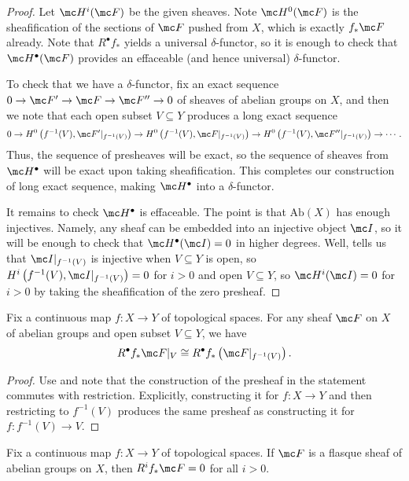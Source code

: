 \documentclass[../notes.tex]{subfiles}
\begin{document}
\begin{proof}
	Let $\mc H^i(\mc F)$ be the given sheaves. Note $\mc H^0(\mc F)$ is the sheafification of the sections of $\mc F$ pushed from $X$, which is exactly $f_*\mc F$ already. Note that $R^\bullet f_*$ yields a universal $\delta$-functor, so it is enough to check that $\mc H^\bullet(\mc F)$ provides an effaceable (and hence universal) $\delta$-functor.

	To check that we have a $\delta$-functor, fix an exact sequence $0\to\mc F'\to\mc F\to\mc F''\to0$ of sheaves of abelian groups on $X$, and then we note that each open subset $V\subseteq Y$ produces a long exact sequence
	\[0\to H^0\left(f^{-1}(V),\mc F'|_{f^{-1}(V)}\right)\to H^0\left(f^{-1}(V),\mc F|_{f^{-1}(V)}\right)\to H^0\left(f^{-1}(V),\mc F''|_{f^{-1}(V)}\right)\to\cdots.\]
	Thus, the sequence of presheaves will be exact, so the sequence of sheaves from $\mc H^\bullet$ will be exact upon taking sheafification. This completes our construction of long exact sequence, making $\mc H^\bullet$ into a $\delta$-functor.

	It remains to check $\mc H^\bullet$ is effaceable. The point is that $\mathrm{Ab}(X)$ has enough injectives. Namely, any sheaf can be embedded into an injective object $\mc I$, so it will be enough to check that $\mc H^\bullet(\mc I)=0$ in higher degrees. Well,  tells us that $\mc I|_{f^{-1}(V)}$ is injective when $V\subseteq Y$ is open, so $H^i\left(f^{-1}(V),\mc I|_{f^{-1}(V)}\right)=0$ for $i>0$ and open $V\subseteq Y$, so $\mc H^i(\mc I)=0$ for $i>0$ by taking the sheafification of the zero presheaf.
\end{proof}
\begin{corollary} \label{cor:res-higher-direct-image}
	Fix a continuous map $f\colon X\to Y$ of topological spaces. For any sheaf $\mc F$ on $X$ of abelian groups and open subset $V\subseteq Y$, we have
	\[R^\bullet f_*\mc F|_V\cong R^\bullet f_*\left(\mc F|_{f^{-1}(V)}\right).\]
\end{corollary}
\begin{proof}
	Use  and note that the construction of the presheaf in the statement commutes with restriction. Explicitly, constructing it for $f\colon X\to Y$ and then restricting to $f^{-1}(V)$ produces the same presheaf as constructing it for $f\colon f^{-1}(V)\to V$.
\end{proof}
\begin{corollary} \label{cor:higher-flasque-is-acyclic}
	Fix a continuous map $f\colon X\to Y$ of topological spaces. If $\mc F$ is a flasque sheaf of abelian groups on $X$, then $R^if_*\mc F=0$ for all $i>0$.
\end{corollary}
\end{document}
